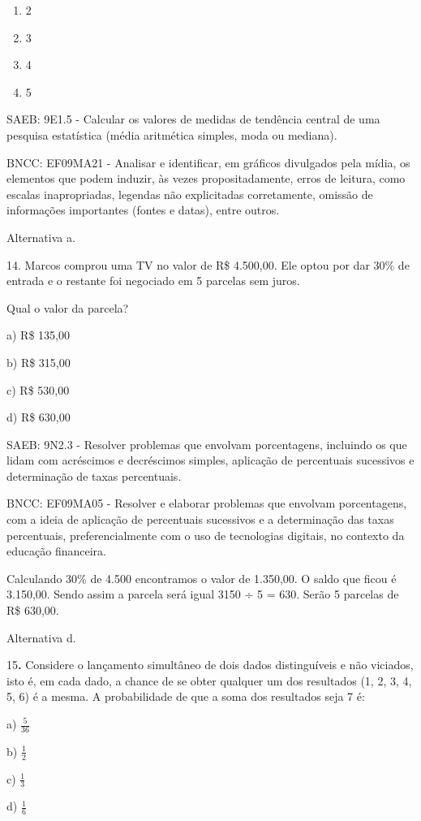 \begin{escolha}
{{{\begin{escolha}
{{{{{\begin{escolha}
\begin{escolha}
{\begin{q°}
\begin{enumerate}
\item
  2
\item
  3
\item
  4
\item
  5
\end{enumerate}

SAEB: 9E1.5 - Calcular os valores de medidas de tendência central de uma
pesquisa estatística (média aritmética simples, moda ou mediana).

BNCC: EF09MA21 - Analisar e identificar, em gráficos divulgados pela
mídia, os elementos que podem induzir, às vezes propositadamente, erros
de leitura, como escalas inapropriadas, legendas não explicitadas
corretamente, omissão de informações importantes (fontes e datas), entre
outros.

Alternativa a.

14. Marcos comprou uma TV no valor de R\$ 4.500,00. Ele optou por dar
30\% de entrada e o restante foi negociado em 5 parcelas sem juros.

Qual o valor da parcela?

a) R\$ 135,00

b) R\$ 315,00

c) R\$ 530,00

d) R\$ 630,00

SAEB: 9N2.3 - Resolver problemas que envolvam porcentagens, incluindo os
que lidam com acréscimos e decréscimos simples, aplicação de percentuais
sucessivos e determinação de taxas percentuais.

BNCC: EF09MA05 - Resolver e elaborar problemas que envolvam
porcentagens, com a ideia de aplicação de percentuais sucessivos e a
determinação das taxas percentuais, preferencialmente com o uso de
tecnologias digitais, no contexto da educação financeira.

Calculando 30\% de 4.500 encontramos o valor de 1.350,00. O saldo que
ficou é 3.150,00. Sendo assim a parcela será igual 3150 ÷ 5 = 630. Serão
5 parcelas de R\$ 630,00.

Alternativa d.

15\textbf{.} Considere o lançamento simultâneo de dois dados
distinguíveis e não viciados, isto é, em cada dado, a chance de se obter
qualquer um dos resultados (1, 2, 3, 4, 5, 6) é a mesma. A probabilidade
de que a soma dos resultados seja 7 é:

a) \(\frac{5}{36}\)

b) \(\frac{1}{2}\)

c) \(\frac{1}{3}\)

d) \(\frac{1}{6}\)


\end{q°}}
\end{escolha}
\end{escolha}}}}}}
\end{escolha}}}}
\end{escolha}
